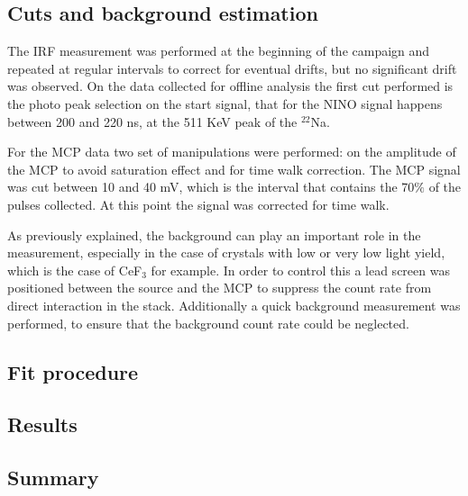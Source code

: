 \subsection{Cuts and background estimation}
The IRF measurement was performed at the beginning of the campaign and repeated at regular intervals to correct for eventual drifts, but no significant drift was observed.
On the data collected for offline analysis the first cut performed is the photo peak selection on the start signal, that for the NINO signal happens between 200 and 220 ns, at the 511 KeV peak of the $^{22}$Na.

For the MCP data two set of manipulations were performed: on the amplitude of the MCP to avoid saturation effect and for time walk correction. 
The MCP signal was cut between 10 and 40 mV, which is the interval that contains the 70$\%$ of the pulses collected. At this point the signal was corrected for time walk.

As previously explained, the background can play an important role in the measurement, especially in the case of crystals with low or very low light yield, which is the case of CeF$_{3}$ for example. 
In order to control this a lead screen was positioned between the source and the MCP to suppress the count rate from direct interaction in the stack. Additionally a quick background measurement was performed, to ensure that the background count rate could be neglected.

\subsection{Fit procedure}

\subsection{Results}
\subsection{Summary}